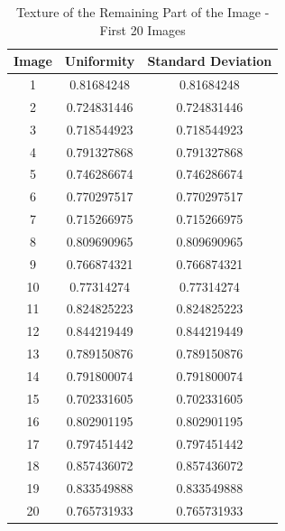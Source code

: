 \documentclass{article}
\begin{document}
\begin{table}[h!]
    \centering
    \begin{tabular}{|c|c|c|}
        \hline
        Image & Uniformity & Standard Deviation \\ \hline
        1 & 0.81684248 & 0.81684248 \\ \hline
        2 & 0.724831446 & 0.724831446 \\ \hline
        3 & 0.718544923 & 0.718544923 \\ \hline
        4 & 0.791327868 & 0.791327868 \\ \hline
        5 & 0.746286674 & 0.746286674 \\ \hline
        6 & 0.770297517 & 0.770297517 \\ \hline
        7 & 0.715266975 & 0.715266975 \\ \hline
        8 & 0.809690965 & 0.809690965 \\ \hline
        9 & 0.766874321 & 0.766874321 \\ \hline
        10 & 0.77314274 & 0.77314274 \\ \hline
        11 & 0.824825223 & 0.824825223 \\ \hline
        12 & 0.844219449 & 0.844219449 \\ \hline
        13 & 0.789150876 & 0.789150876 \\ \hline
        14 & 0.791800074 & 0.791800074 \\ \hline
        15 & 0.702331605 & 0.702331605 \\ \hline
        16 & 0.802901195 & 0.802901195 \\ \hline
        17 & 0.797451442 & 0.797451442 \\ \hline
        18 & 0.857436072 & 0.857436072 \\ \hline
        19 & 0.833549888 & 0.833549888 \\ \hline
        20 & 0.765731933 & 0.765731933 \\ \hline
    \end{tabular}
    \caption{Texture of the Remaining Part of the Image - First 20 Images}
    \label{tab:texture_yellow_0120}
\end{table}
\end{document}
